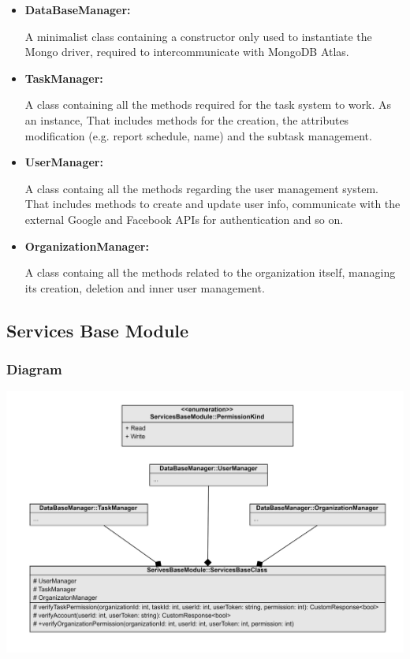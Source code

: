 \documentclass{article}
\begin{document}
\begin{itemize}
  \item \textbf{DataBaseManager: }
  
  A minimalist class containing a constructor only used to instantiate the Mongo driver, required to intercommunicate with MongoDB Atlas.

  \item \textbf{TaskManager: }
  
  A class containing all the methods required for the task system to work. As an instance, That includes methods for the creation, the attributes modification (e.g. report schedule, name) and the subtask management.

  \item \textbf{UserManager: }
  
  A class containg all the methods regarding the user management system. That includes methods to create and update user info, communicate with the external Google and Facebook APIs for authentication and so on.

  \item \textbf{OrganizationManager: }
  
  A class containg all the methods related to the organization itself, managing its creation, deletion and inner user management.

\end {itemize}


\subsection{Services Base Module}

\subsubsection{Diagram}

\includegraphics[width=\textwidth,height=\textheight,keepaspectratio]{images/class_diagram/services_base_.jpg}
\end{document}

